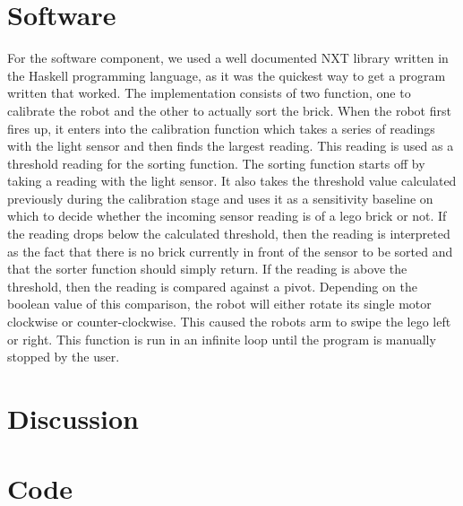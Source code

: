 \documentclass{article}
\begin{document}
\section{Software}
For the software component, we used a well documented NXT library written in the Haskell programming language, as it was the quickest way to get a program written that worked.
The implementation consists of two function, one to calibrate the robot and the other to actually sort the brick.
When the robot first fires up, it enters into the calibration function which takes a series of readings with the light sensor and then finds the largest reading.
This reading is used as a threshold reading for the sorting function.
The sorting function starts off by taking a reading with the light sensor.
It also takes the threshold value calculated previously during the calibration stage and uses it as a sensitivity baseline on which to decide whether the incoming sensor reading is of a lego brick or not.
If the reading drops below the calculated threshold, then the reading is interpreted as the fact that there is no brick currently in front of the sensor to be sorted and that the sorter function should simply return.
If the reading is above the threshold, then the reading is compared against a pivot.
Depending on the boolean value of this comparison, the robot will either rotate its single motor clockwise or counter-clockwise.
This caused the robots arm to swipe the lego left or right.
This function is run in an infinite loop until the program is manually stopped by the user.

\section{Discussion}

\newpage
\appendix
\section{Code}


\end{document}
